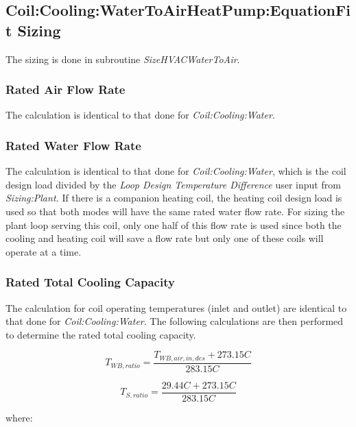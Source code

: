 \subsection{Coil:Cooling:WaterToAirHeatPump:EquationFit Sizing}\label{coilcoolingwatertoairheatpumpequationfit-sizing}

The sizing is done in subroutine \emph{SizeHVACWaterToAir}.

\subsubsection{Rated Air Flow Rate}\label{rated-air-flow-rate}

The calculation is identical to that done for \emph{Coil:Cooling:Water}.

\subsubsection{Rated Water Flow Rate}\label{rated-water-flow-rate}

The calculation is identical to that done for \emph{Coil:Cooling:Water}, which is the coil design load divided by the \emph{Loop Design Temperature Difference} user input from \emph{Sizing:Plant.} If there is a companion heating coil, the heating coil design load is used so that both modes will have the same rated water flow rate. For sizing the plant loop serving this coil, only one half of this flow rate is used since both the cooling and heating coil will save a flow rate but only one of these coils will operate at a time.

\subsubsection{Rated Total Cooling Capacity}\label{rated-total-cooling-capacity}

The calculation for coil operating temperatures (inlet and outlet) are identical to that done for \emph{Coil:Cooling:Water}. The following calculations are then performed to determine the rated total cooling capacity.

\begin{equation}
  T_{WB,ratio} = \frac{T_{WB,air,in,des}+273.15C}{283.15C}
\end{equation}

\begin{equation}
  T_{S,ratio} = \frac{29.44C+273.15C}{283.15C}
\end{equation}

where:

